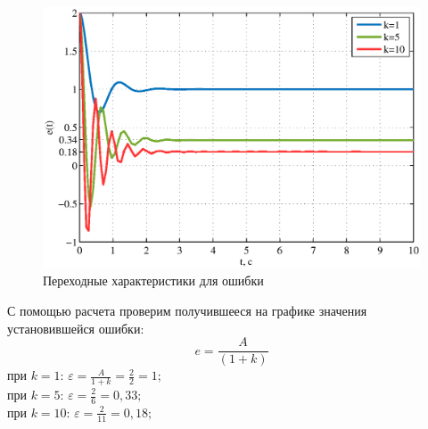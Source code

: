 \documentclass[a4paper,12pt]{article} %
\begin{document}
\begin{figure}[H]
	\centering
	\includegraphics[width=1\linewidth]{scheme/plot2.eps}
	\caption{Переходные характеристики для ошибки}
\end{figure}
\newpage

\par С помощью расчета проверим получившееся на графике значения установившейся ошибки:
\begin{equation}
	e = \frac{A}{(1+k)}
\end{equation}
при $k=1$: $\varepsilon = \displaystyle{\frac{A}{1+k}}={\frac{2}{2}}=1;$\\
при $k=5$: $\varepsilon = \displaystyle{\frac{2}{6}}=0,33;$\\
при $k=10$: $\varepsilon = \displaystyle{\frac{2}{11}}=0,18;$\\
\end{document}

